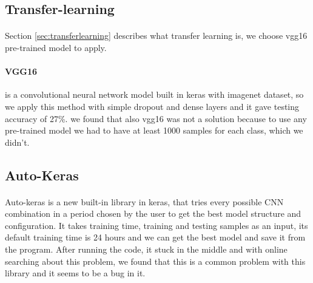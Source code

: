\subsection{Transfer-learning}
\paragraph{}
Section \ref{sec:transferlearning} describes what transfer learning is, we choose vgg16 pre-trained model to apply.

\paragraph{VGG16}
is a convolutional neural network model built in keras with imagenet dataset, so we apply this method with simple dropout and dense layers and it gave testing accuracy of 27\%.
we found that also vgg16 was not a solution because to use any pre-trained model we had to have at least 1000 samples for each class, which we didn't.

\subsection{Auto-Keras}
\paragraph{}
Auto-keras is a new built-in library in keras, that tries every possible CNN combination in a period chosen by the user to get the best model structure and configuration. It takes training time, training and testing samples as an input, its default training time is 24 hours and we can get the best model and save it from the program.
After running the code, it stuck in the middle and with online searching about this problem, we found that this is a common problem with this library and it seems to be a bug in it.

